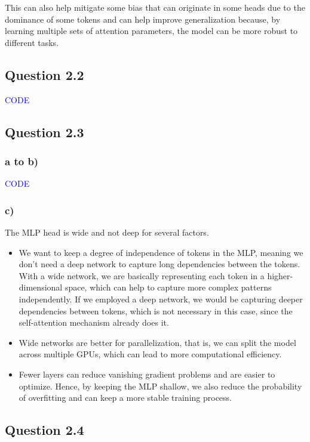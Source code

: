 \documentclass{article}
\begin{document}
This can also help mitigate some bias that can originate in some
heads due to the dominance of some tokens and can help improve generalization because, by learning multiple sets of
attention parameters, the model can be more robust to different tasks.

\subsection*{Question 2.2}

\textcolor{blue}{CODE}

\subsection*{Question 2.3}

\subsubsection*{a to b)}
\textcolor{blue}{CODE}

\subsubsection*{c)}

The MLP head is wide and not deep for several factors.
\begin{itemize}
    \item We want to keep a degree of independence of tokens in the MLP, meaning we don't need a deep network to capture
    long dependencies between the tokens. With a wide network, we are basically representing each token in a higher-dimensional
    space, which can help to capture more complex patterns independently. If we employed a deep network, we would be
    capturing deeper dependencies between tokens, which is not necessary in this case, since the self-attention mechanism already
    does it.
    \item Wide networks are better for parallelization, that is, we can split the model across multiple
    GPUs, which can lead to more computational efficiency. 
    \item Fewer layers can reduce vanishing gradient problems and are easier to optimize. Hence, by keeping the MLP shallow, we also reduce the probability of overfitting
    and can keep a more stable training process.
\end{itemize}


\subsection*{Question 2.4}
\end{document}
